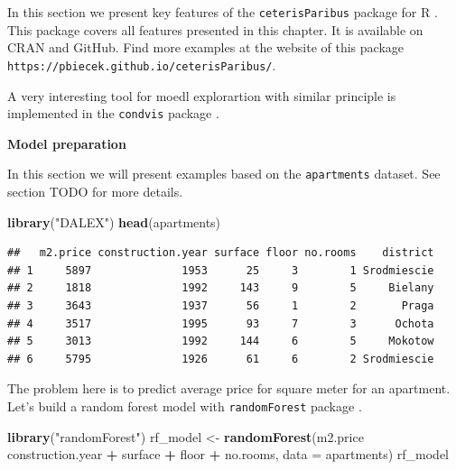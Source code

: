 \documentclass[]{krantz}
\newenvironment{Shaded}{\begin{snugshade}}{\end{snugshade}}
\newcommand{\DataTypeTok}[1]{\textcolor[rgb]{0.13,0.29,0.53}{#1}}
\newcommand{\KeywordTok}[1]{\textcolor[rgb]{0.13,0.29,0.53}{\textbf{#1}}}
\newcommand{\NormalTok}[1]{#1}
\newcommand{\OperatorTok}[1]{\textcolor[rgb]{0.81,0.36,0.00}{\textbf{#1}}}
\newcommand{\StringTok}[1]{\textcolor[rgb]{0.31,0.60,0.02}{#1}}
\theoremstyle{definition}
\theoremstyle{definition}
\theoremstyle{definition}
\theoremstyle{remark}
\begin{document}
In this section we present key features of the \texttt{ceterisParibus}
package for R \citep{R-ceterisParibus}. This package covers all features
presented in this chapter. It is available on CRAN and GitHub. Find more
examples at the website of this package
\texttt{https://pbiecek.github.io/ceterisParibus/}.

A very interesting tool for moedl explorartion with similar principle is
implemented in the \texttt{condvis} package \citep{JSSv081i05}.

\textbf{Model preparation}

In this section we will present examples based on the
\texttt{apartments} dataset. See section TODO for more details.

\begin{Shaded}
\begin{Highlighting}[]
\KeywordTok{library}\NormalTok{(}\StringTok{"DALEX"}\NormalTok{)}
\KeywordTok{head}\NormalTok{(apartments)}
\end{Highlighting}
\end{Shaded}

\begin{verbatim}
##   m2.price construction.year surface floor no.rooms    district
## 1     5897              1953      25     3        1 Srodmiescie
## 2     1818              1992     143     9        5     Bielany
## 3     3643              1937      56     1        2       Praga
## 4     3517              1995      93     7        3      Ochota
## 5     3013              1992     144     6        5     Mokotow
## 6     5795              1926      61     6        2 Srodmiescie
\end{verbatim}

The problem here is to predict average price for square meter for an
apartment. Let's build a random forest model with \texttt{randomForest}
package \citep{R-randomForest}.

\begin{Shaded}
\begin{Highlighting}[]
\KeywordTok{library}\NormalTok{(}\StringTok{"randomForest"}\NormalTok{)}
\NormalTok{rf_model <-}\StringTok{ }\KeywordTok{randomForest}\NormalTok{(m2.price }\OperatorTok{~}\StringTok{ }\NormalTok{construction.year }\OperatorTok{+}\StringTok{ }\NormalTok{surface }\OperatorTok{+}\StringTok{ }\NormalTok{floor }\OperatorTok{+}
\StringTok{      }\NormalTok{no.rooms, }\DataTypeTok{data =}\NormalTok{ apartments)}
\NormalTok{rf_model}
\end{Highlighting}
\end{Shaded}
\end{document}

